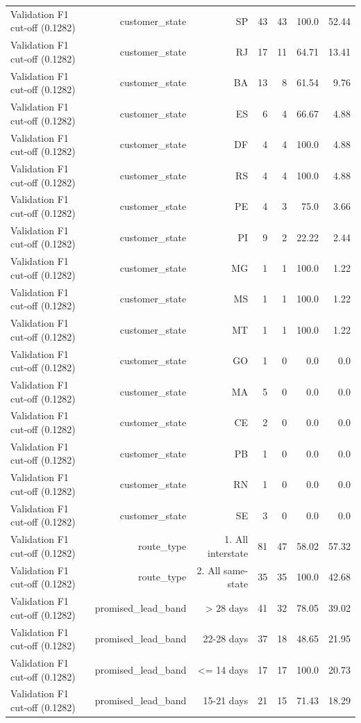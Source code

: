 \begin{table}[htbp]
\begin{tabular}{lrrrrrr}
Validation F1 cut-off (0.1282) & customer\_state & SP & 43 & 43 & 100.0 & 52.44 \\
Validation F1 cut-off (0.1282) & customer\_state & RJ & 17 & 11 & 64.71 & 13.41 \\
Validation F1 cut-off (0.1282) & customer\_state & BA & 13 & 8 & 61.54 & 9.76 \\
Validation F1 cut-off (0.1282) & customer\_state & ES & 6 & 4 & 66.67 & 4.88 \\
Validation F1 cut-off (0.1282) & customer\_state & DF & 4 & 4 & 100.0 & 4.88 \\
Validation F1 cut-off (0.1282) & customer\_state & RS & 4 & 4 & 100.0 & 4.88 \\
Validation F1 cut-off (0.1282) & customer\_state & PE & 4 & 3 & 75.0 & 3.66 \\
Validation F1 cut-off (0.1282) & customer\_state & PI & 9 & 2 & 22.22 & 2.44 \\
Validation F1 cut-off (0.1282) & customer\_state & MG & 1 & 1 & 100.0 & 1.22 \\
Validation F1 cut-off (0.1282) & customer\_state & MS & 1 & 1 & 100.0 & 1.22 \\
Validation F1 cut-off (0.1282) & customer\_state & MT & 1 & 1 & 100.0 & 1.22 \\
Validation F1 cut-off (0.1282) & customer\_state & GO & 1 & 0 & 0.0 & 0.0 \\
Validation F1 cut-off (0.1282) & customer\_state & MA & 5 & 0 & 0.0 & 0.0 \\
Validation F1 cut-off (0.1282) & customer\_state & CE & 2 & 0 & 0.0 & 0.0 \\
Validation F1 cut-off (0.1282) & customer\_state & PB & 1 & 0 & 0.0 & 0.0 \\
Validation F1 cut-off (0.1282) & customer\_state & RN & 1 & 0 & 0.0 & 0.0 \\
Validation F1 cut-off (0.1282) & customer\_state & SE & 3 & 0 & 0.0 & 0.0 \\
Validation F1 cut-off (0.1282) & route\_type & 1. All interstate & 81 & 47 & 58.02 & 57.32 \\
Validation F1 cut-off (0.1282) & route\_type & 2. All same-state & 35 & 35 & 100.0 & 42.68 \\
Validation F1 cut-off (0.1282) & promised\_lead\_band & > 28 days & 41 & 32 & 78.05 & 39.02 \\
Validation F1 cut-off (0.1282) & promised\_lead\_band & 22-28 days & 37 & 18 & 48.65 & 21.95 \\
Validation F1 cut-off (0.1282) & promised\_lead\_band & <= 14 days & 17 & 17 & 100.0 & 20.73 \\
Validation F1 cut-off (0.1282) & promised\_lead\_band & 15-21 days & 21 & 15 & 71.43 & 18.29 \\
\bottomrule
\end{tabular}
\par\smallskip\begin{minipage}{\linewidth}\footnotesize \end{minipage}
\end{table}

